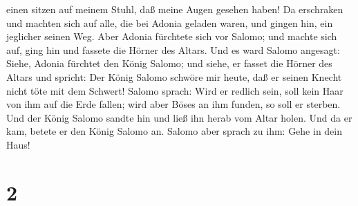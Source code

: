 einen sitzen auf meinem Stuhl, daß meine Augen gesehen haben!
 Da erschraken und machten sich auf alle, die bei Adonia
geladen waren, und gingen hin, ein jeglicher seinen Weg. 
Aber Adonia fürchtete sich vor Salomo; und machte sich auf, ging hin und
fassete die Hörner des Altars.  Und es ward Salomo
angesagt: Siehe, Adonia fürchtet den König Salomo; und siehe, er fasset
die Hörner des Altars und spricht: Der König Salomo schwöre mir heute,
daß er seinen Knecht nicht töte mit dem Schwert!  Salomo
sprach: Wird er redlich sein, soll kein Haar von ihm auf die Erde
fallen; wird aber Böses an ihm funden, so soll er sterben. 
Und der König Salomo sandte hin und ließ ihn herab vom Altar holen. Und
da er kam, betete er den König Salomo an. Salomo aber sprach zu ihm:
Gehe in dein Haus!

\hypertarget{section-1}{%
\section{2}\label{section-1}}


